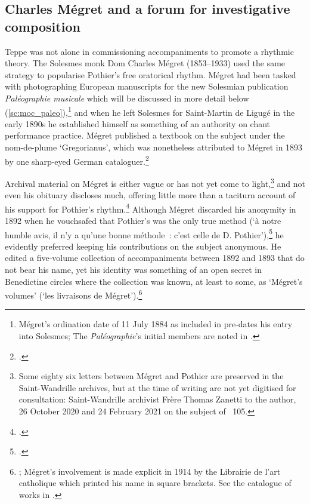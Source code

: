 \subsection{Charles Mégret and a forum for investigative composition}
Teppe was not alone in commissioning accompaniments to promote a rhythmic theory. The Solesmes monk Dom Charles Mégret (1853--1933) used the same strategy to popularise Pothier's free oratorical rhythm.
Mégret had been tasked with photographing European manuscripts for the new Solesmian publication \emph{Paléographie musicale} which will be discussed in more detail below (\cref{sc:moc_paleo}),\footnote{Mégret's ordination date of 11 July 1884 as included in \cite[133]{BibliographieBenedictinscongregation1889} pre-dates his entry into Solesmes; The \emph{Paléographie}'s initial members are noted in \cite[161 n.~27]{ScarcezecritsplainchantGevaert2010}.} and when he left Solesmes for Saint-Martin de Ligugé in the early 1890s he established himself as something of an authority on chant performance practice.
Mégret published a textbook on the subject under the nom-de-plume `Gregorianus', which was nonetheless attributed to Mégret in 1893 by one sharp-eyed German cataloguer.\footcite[The textbook in question, \emph{Des conseils pratiques sur le chant liturgique dans les seminaires, les communautés et les paroisses}, is attributed to Mégret in][104]{PlaineBeitraegezurGeschichte1893}

Archival material on Mégret is either vague or has not yet come to light,\footnote{Some eighty six letters between Mégret and Pothier are preserved in the Saint-Wandrille archives, but at the time of writing are not yet digitised for consultation: Saint-Wandrille archivist Frère Thomas Zanetti to the author, 26 October 2020 and 24 February 2021 on the subject of \swf{}~105.} and not even his obituary discloses much, offering little more than a taciturn account of his support for Pothier's rhythm.\footcite[63]{DomCharlesMegret1933}
Although Mégret discarded his anonymity in 1892 when he vouchsafed that Pothier's was the only true method (`à notre humble avis, il n'y a qu'une bonne méthode~: c'est celle de D. Pothier'),\footcite[53]{Megretchantliturgiquedans1892} he evidently preferred keeping his contributions on the subject anonymous.
He edited a five-volume collection of accompaniments between 1892 and 1893 that do not bear his name, yet his identity was something of an open secret in Benedictine circles where the collection was known, at least to some, as `Mégret's volumes' (`les livraisons de Mégret').\footnote{; Mégret's involvement is made explicit in 1914 by the Librairie de l'art catholique which printed his name in square brackets. See the catalogue of works in \cite[6]{Parisotaccompagnementmodalchant1914}.}

